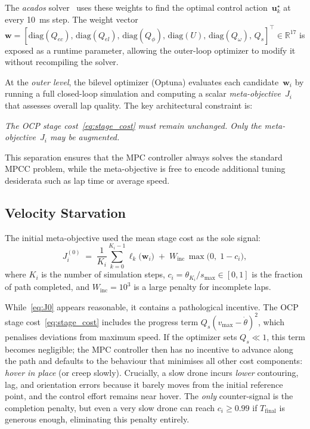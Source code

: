 The \emph{acados} solver~\cite{verschueren2021acados} uses these
weights to find the optimal control action~$\mathbf{u}^{\star}_k$
at every \SI{10}{ms} step.
The weight vector
$\mathbf{w} = [\mathrm{diag}(Q_{ec}),\,\mathrm{diag}(Q_{el}),\,
\mathrm{diag}(Q_{\phi}),\,\mathrm{diag}(U),\,
\mathrm{diag}(Q_{\omega}),\,Q_s]^{\!\top} \in \mathbb{R}^{17}$
is exposed as a runtime parameter, allowing the outer-loop
optimizer to modify it without recompiling the solver.

\smallskip
At the \emph{outer level}, the bilevel optimizer (Optuna)
evaluates each candidate~$\mathbf{w}_i$ by running a full
closed-loop simulation and computing a scalar
\emph{meta-objective}~$J_i$ that assesses overall lap quality.
The key architectural constraint is:
%
\begin{center}
  \emph{The OCP stage cost~\eqref{eq:stage_cost} must remain
  unchanged.  Only the meta-objective~$J_i$ may be augmented.}
\end{center}
%
This separation ensures that the MPC controller always solves
the standard MPCC problem, while the meta-objective is free to
encode additional tuning desiderata such as lap time or average
speed.


\subsection{Velocity Starvation}
\label{sec:velocity_starvation}

The initial meta-objective used the mean stage cost as
the sole signal:
%
\begin{equation}
  J_i^{(0)}
  \;=\;
  \frac{1}{K_i}\sum_{k=0}^{K_i - 1}
    \ell_k\!\bigl(\mathbf{w}_i\bigr)
  \;+\;
  W_{\text{inc}}\,\max\!\bigl(0,\;1 - c_i\bigr),
  \label{eq:J0}
\end{equation}
%
where $K_i$ is the number of simulation steps, $c_i = \theta_{K_i}/s_{\max}
\in [0,1]$ is the fraction of path completed, and
$W_{\text{inc}} = 10^{3}$ is a large penalty for incomplete laps.

While~\eqref{eq:J0} appears reasonable, it contains a
pathological incentive.
The OCP stage cost~\eqref{eq:stage_cost} includes the
progress term $Q_s(v_{\max} - \dot\theta)^2$, which penalises
deviations from maximum speed.
If the optimizer sets $Q_s \ll 1$, this term becomes negligible;
the MPC controller then has no incentive to advance along the
path and defaults to the behaviour that minimises all other
cost components: \emph{hover in place} (or creep slowly).
Crucially, a slow drone incurs \emph{lower} contouring,
lag, and orientation errors because it barely moves from the
initial reference point, and the control effort remains near
hover.
The \emph{only} counter-signal is the completion penalty, but
even a very slow drone can reach $c_i \ge 0.99$ if $T_{\text{final}}$
is generous enough, eliminating this penalty entirely.

